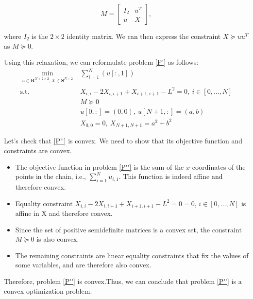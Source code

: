 \documentclass[10pt,a4paper,notitlepage,twocolumn]{article}
\begin{document}
\begin{equation*}
M = \begin{bmatrix} I_2 & u^T \\ u & X \end{bmatrix},
\end{equation*}

where $I_2$ is the $2 \times 2$ identity matrix. We can then express the constraint $X \succeq uu^T$ as $M \succeq 0$.

Using this relaxation, we can reformulate problem \eqref{P'} as follows:
\begin{equation}\label{P''}
    \tag{$P''$}
    \begin{array}{cl}
     \underset{\substack{u \in \mathbf{R}^{N+2 \times 2}, X \in \mathbf{S}^{N+2}}}{\min} & \sum\limits_{i=1}^N (u[:, 1]) \\
     \text{s.t.} & X_{i,i} - 2X_{i,i+1} + X_{i+1,i+1}-L^2=0,\ i \in [0,\dots,N] \\
     & M \succeq 0 \\
     & u[0,:] = (0,0),\ u[N+1,:]=(a,b) \\
     & X_{0,0}=0,\ X_{N+1, N+1}=a^2+b^2 
\end{array}
\end{equation}

Let's check that \eqref{P''} is convex. We need to show that its objective function and constraints are convex.
\begin{itemize}
    \item The objective function in problem \eqref{P''} is the sum of the $x$-coordinates of the points in the chain, i.e., $\sum_{i=1}^N u_{i,1}$. This function is indeed affine and therefore convex.
    \item Equality constraint $X_{i,i} - 2X_{i,i+1} + X_{i+1,i+1}-L^2=0 = 0$, $i \in [0,\dots,N]$ is affine in X and therefore convex.
    \item Since the set of positive semidefinite matrices is a convex set, the constraint $M \succeq 0$ is also convex. 
    \item The remaining constraints are linear equality constraints that fix the values of some variables, and are therefore also convex.
\end{itemize}
Therefore, problem \eqref{P''} is convex.Thus, we can conclude that problem \eqref{P''} is a convex optimization problem.
\end{document}
